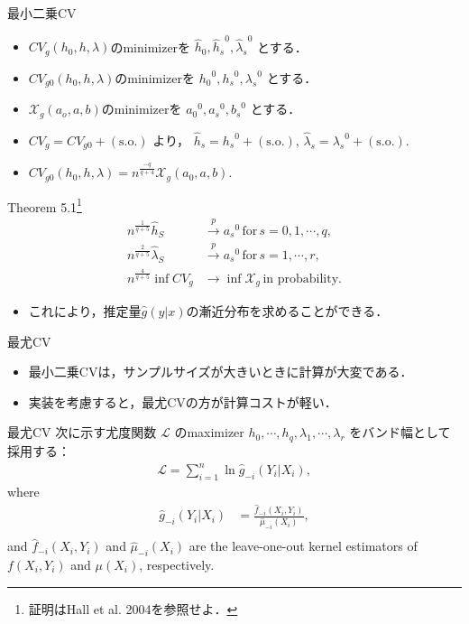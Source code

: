 \documentclass[xcolor=svgnames,dvipdfmx,cjk]{beamer}
\theoremstyle{example}
\begin{document}
\begin{frame}{最小二乗CV}
  \begin{itemize}
    \item $CV_g(h_0, h, \lambda)$のminimizerを
          $\hat{h}_0,
          {\hat{h}_s}^0,  
          {\hat{\lambda}_s}^0
          $
          とする．
    \item $CV_{g0}(h_0, h, \lambda)$のminimizerを
          ${h_0}^0 , 
          {h_s}^0 , 
          {\lambda_s}^0 $
          とする．
    \item  $\mathcal{X}_g(a_o, a, b)$のminimizerを
           ${a_0}^0, 
            {a_s}^0 ,
            {b_s}^0 $
            とする．
    \item $CV_g = CV_{g0} + (\text{s.o.})$
          より，
          $\hat{h}_s = {h_s}^0 + (\text{s.o.}), \,
           \hat{\lambda}_s = {\lambda_s}^0 + (\text{s.o.}).$
    \item $CV_{g0} (h_0, h, \lambda) 
          = n^{\frac{-q}{q+4}} \mathcal{X}_g (a_0, a, b).$
  \end{itemize}
  \begin{itembox}[l]{Theorem 5.1\footnote{証明はHall et al. 2004を参照せよ．}}
    \begin{align*}
      n^{\frac{1}{q+5}} \hat{h}_S
       &\xrightarrow{p} {a_s}^0 \, \text{for}\,s=0,1,\cdots,q, \\
      n^{\frac{2}{q+5}} \hat{\lambda}_S
       &\xrightarrow{p} {a_s}^0 \, \text{for}\,s=1,\cdots,r, \\
      n^{\frac{4}{q+5}} \inf CV_g 
       &\to \inf \mathcal{X}_g \, \text{in probability.}
     \end{align*}
  \end{itembox}
  \begin{itemize}
    \item これにより，推定量$\hat{g}(y|x)$の漸近分布を求めることができる．
  \end{itemize}
\end{frame}

\begin{frame}{最尤CV}
  \begin{itemize}
    \item 最小二乗CVは，サンプルサイズが大きいときに計算が大変である．
    \item 実装を考慮すると，最尤CVの方が計算コストが軽い．
  \end{itemize}
\end{frame}

\begin{frame}{最尤CV}
 \quad 
 次に示す尤度関数
 $\mathcal{L}$
 のmaximizer
 $h_0, \cdots, h_q, \lambda_1, \cdots, \lambda_r$
 をバンド幅として採用する：
 \begin{align*}
  \mathcal{L} = \sum_{i=1}^n \ln \hat{g}_{-i}(Y_i|X_i),
 \end{align*}
 where 
 \begin{align*}
  \hat{g}_{-i}(Y_i|X_i) 
    &= \frac{\hat{f}_{-i}(X_i,Y_i)}{\hat{\mu}_{-i}(X_i)}, \\
 \end{align*}
 and
 $\hat{f}_{-i}(X_i,Y_i)$
 and
 $\hat{\mu}_{-i}(X_i)$
 are the leave-one-out kernel estimators of 
 $f(X_i,Y_i)$
 and
 $\mu(X_i)$,
 respectively.
\end{frame}
\end{document}
